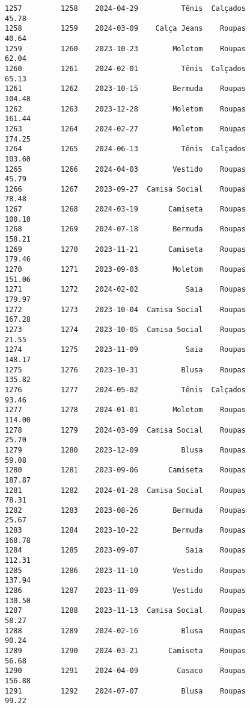 \documentclass[11pt]{article}
\begin{document}
\begin{Verbatim}[commandchars=\\\{\}]
1257         1258    2024-04-29          Tênis  Calçados           45.78   
1258         1259    2024-03-09    Calça Jeans    Roupas           40.64   
1259         1260    2023-10-23        Moletom    Roupas           62.04   
1260         1261    2024-02-01          Tênis  Calçados           65.13   
1261         1262    2023-10-15        Bermuda    Roupas          104.48   
1262         1263    2023-12-28        Moletom    Roupas          161.44   
1263         1264    2024-02-27        Moletom    Roupas          174.25   
1264         1265    2024-06-13          Tênis  Calçados          103.60   
1265         1266    2024-04-03        Vestido    Roupas           45.79   
1266         1267    2023-09-27  Camisa Social    Roupas           78.48   
1267         1268    2024-03-19       Camiseta    Roupas          100.10   
1268         1269    2024-07-18        Bermuda    Roupas          158.21   
1269         1270    2023-11-21       Camiseta    Roupas          179.46   
1270         1271    2023-09-03        Moletom    Roupas          151.06   
1271         1272    2024-02-02           Saia    Roupas          179.97   
1272         1273    2023-10-04  Camisa Social    Roupas          167.28   
1273         1274    2023-10-05  Camisa Social    Roupas           21.55   
1274         1275    2023-11-09           Saia    Roupas          148.17   
1275         1276    2023-10-31          Blusa    Roupas          135.82   
1276         1277    2024-05-02          Tênis  Calçados           93.46   
1277         1278    2024-01-01        Moletom    Roupas          114.00   
1278         1279    2024-03-09  Camisa Social    Roupas           25.70   
1279         1280    2023-12-09          Blusa    Roupas           59.08   
1280         1281    2023-09-06       Camiseta    Roupas          187.87   
1281         1282    2024-01-28  Camisa Social    Roupas           78.31   
1282         1283    2023-08-26        Bermuda    Roupas           25.67   
1283         1284    2023-10-22        Bermuda    Roupas          168.78   
1284         1285    2023-09-07           Saia    Roupas          112.31   
1285         1286    2023-11-10        Vestido    Roupas          137.94   
1286         1287    2023-11-09        Vestido    Roupas          130.50   
1287         1288    2023-11-13  Camisa Social    Roupas           58.27   
1288         1289    2024-02-16          Blusa    Roupas           90.24   
1289         1290    2024-03-21       Camiseta    Roupas           56.68   
1290         1291    2024-04-09         Casaco    Roupas          156.88   
1291         1292    2024-07-07          Blusa    Roupas           99.22   

\end{Verbatim}
\end{document}
